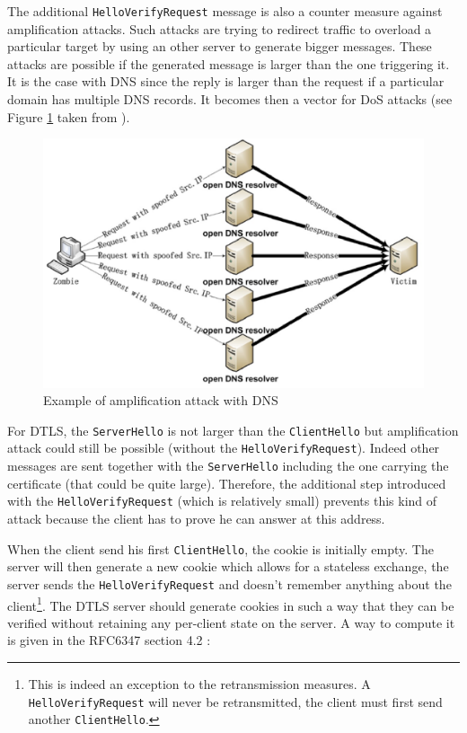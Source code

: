 The additional \texttt{HelloVerifyRequest} message is also a counter measure against amplification attacks. Such attacks are trying to redirect traffic to overload a particular target by using an other server to generate bigger messages. These attacks are possible if the generated message is larger than the one triggering it. It is the case with DNS since the reply is larger than the request if a particular domain has multiple DNS records. It becomes then a vector for DoS attacks (see Figure \ref{fig:amp_attack} taken from \cite{dns-amp}).


\begin{figure}[!ht]
\centering
\includegraphics[width=\textwidth]{images/amplificationattacks}
\caption{Example of amplification attack with DNS}
\label{fig:amp_attack}
\end{figure}

For DTLS, the \texttt{ServerHello} is not larger than the \texttt{ClientHello} but amplification attack could still be possible (without the \texttt{HelloVerifyRequest}). Indeed other messages are sent together with the \texttt{ServerHello} including the one carrying the certificate (that could be quite large). Therefore, the additional step introduced with the \texttt{HelloVerifyRequest} (which is relatively small) prevents this kind of attack because the client has to prove he can answer at this address.



When the client send his first \texttt{ClientHello}, the cookie is initially empty. The server will then generate a new cookie which allows for a stateless exchange, the server sends the \texttt{HelloVerifyRequest} and doesn't remember anything about the client\footnote{This is indeed an exception to the retransmission measures. A \texttt{HelloVerifyRequest} will never be retransmitted, the client must first send another \texttt{ClientHello}.}. The DTLS server should generate cookies in such a way that they can be verified without retaining any per-client state on the server. A way to compute it is given in the RFC6347 section 4.2 \cite{rfc6347}:

